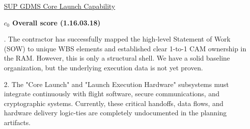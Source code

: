 % 


\begin{frame}{\href{run:../local/source-docs/1.16.03.18.pdf}{SUP GDMS Core Launch Capability}}
\centering
{}
\par
\vspace{0.75em}
\textbf{\small{\(c_0\) Overall score {\tiny (1.16.03.18)}}}\\\par
\vspace{0.5em}
\begin{minipage}{0.85\textwidth}
\raggedright
\fontsize{7}{9}. The contractor has successfully mapped the high-level Statement of Work (SOW) to unique WBS elements and established clear 1-to-1 CAM ownership in the RAM. However, this is only a structural shell. We have a solid baseline organization, but the underlying execution data is not yet proven.\par\vspace{0.5em}2. The "Core Launch" and "Launch Execution Hardware" subsystems must integrate continuously with flight software, secure communications, and cryptographic systems. Currently, these critical handoffs, data flows, and hardware delivery logic-ties are completely undocumented in the planning artifacts.\par
\end{minipage}
\end{frame}
%
